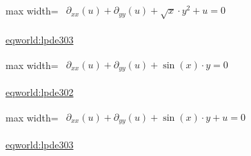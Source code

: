 \documentclass[10pt,a4paper]{article}
\begin{document}
\begin{minipage}{\linewidth}
\begin{center}\begin{adjustbox}{max width=\linewidth}$\displaystyle\begin{gathered}\begin{gathered}\partial_{xx}(u)+\partial_{yy}(u)+\sqrt{x}\cdot y^{2}+u=0\end{gathered}\end{gathered}$\end{adjustbox}\end{center}
{\small \href{https://eqworld.ipmnet.ru/en/solutions/lpde/lpde303.pdf}{eqworld:lpde303}}\par
\end{minipage}\par\vspace{7mm}

\begin{minipage}{\linewidth}
\begin{center}\begin{adjustbox}{max width=\linewidth}$\displaystyle\begin{gathered}\begin{gathered}\partial_{xx}(u)+\partial_{yy}(u)+\sin(x)\cdot y=0\end{gathered}\end{gathered}$\end{adjustbox}\end{center}
{\small \href{https://eqworld.ipmnet.ru/en/solutions/lpde/lpde302.pdf}{eqworld:lpde302}}\par
\end{minipage}\par\vspace{7mm}

\begin{minipage}{\linewidth}
\begin{center}\begin{adjustbox}{max width=\linewidth}$\displaystyle\begin{gathered}\begin{gathered}\partial_{xx}(u)+\partial_{yy}(u)+\sin(x)\cdot y+u=0\end{gathered}\end{gathered}$\end{adjustbox}\end{center}
{\small \href{https://eqworld.ipmnet.ru/en/solutions/lpde/lpde303.pdf}{eqworld:lpde303}}\par
\end{minipage}\par\vspace{7mm}
\end{document}
